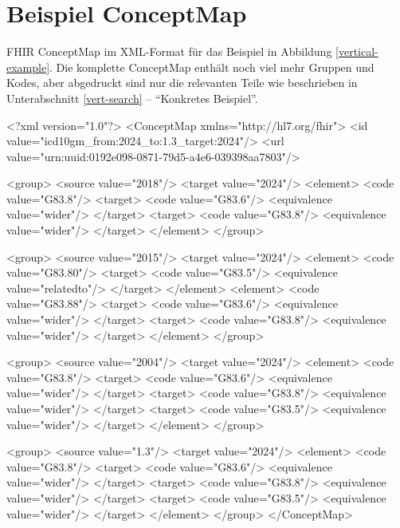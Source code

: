 \section{Beispiel ConceptMap}
\label{conceptmap-example}

FHIR ConceptMap im XML-Format für das Beispiel in Abbildung \ref{vertical-example}. Die komplette ConceptMap enthält noch viel mehr Gruppen und Kodes, aber abgedruckt sind nur die relevanten Teile wie beschrieben in Unterabschnitt \ref{vert-search} -- "`Konkretes Beispiel"'. \\

\begin{Code}
<?xml version="1.0"?>
<ConceptMap xmlns="http://hl7.org/fhir">
  <id value="icd10gm_from:2024_to:1.3_target:2024"/>
  <url value="urn:uuid:0192e098-0871-79d5-a4e6-039398aa7803"/>

<group>
  <source value="2018"/>
  <target value="2024"/>
  <element>
    <code value="G83.8"/>
    <target>
      <code value="G83.6"/>
      <equivalence value="wider"/>
    </target>
    <target>
      <code value="G83.8"/>
      <equivalence value="wider"/>
    </target>
  </element>
</group>

<group>
  <source value="2015"/>
  <target value="2024"/>
  <element>
    <code value="G83.80"/>
    <target>
      <code value="G83.5"/>
      <equivalence value="relatedto"/>
    </target>
  </element>
  <element>
    <code value="G83.88"/>
    <target>
      <code value="G83.6"/>
      <equivalence value="wider"/>
    </target>
    <target>
      <code value="G83.8"/>
      <equivalence value="wider"/>
    </target>
  </element>
</group>

<group>
  <source value="2004"/>
  <target value="2024"/>
  <element>
    <code value="G83.8"/>
    <target>
      <code value="G83.6"/>
      <equivalence value="wider"/>
    </target>
    <target>
      <code value="G83.8"/>
      <equivalence value="wider"/>
    </target>
    <target>
      <code value="G83.5"/>
      <equivalence value="wider"/>
    </target>
  </element>
</group>

<group>
  <source value="1.3"/>
  <target value="2024"/>
  <element>
    <code value="G83.8"/>
    <target>
      <code value="G83.6"/>
      <equivalence value="wider"/>
    </target>
    <target>
      <code value="G83.8"/>
      <equivalence value="wider"/>
    </target>
    <target>
      <code value="G83.5"/>
      <equivalence value="wider"/>
    </target>
  </element>
</group>
</ConceptMap>
\end{Code}
